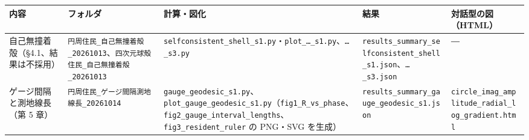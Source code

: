 \documentclass[
  a4paper,
]{ltjsarticle}
\newcounter{none} %
\begin{document}
{\def\LTcaptype{none} %
\begin{longtable}[]{@{}
  >{\raggedright\arraybackslash}p{}
  >{\raggedright\arraybackslash}p{}
  >{\raggedright\arraybackslash}p{}
  >{\raggedright\arraybackslash}p{}
  >{\raggedright\arraybackslash}p{}@{}}
\toprule\noalign{}
\begin{minipage}[b]{\linewidth}\raggedright
内容
\end{minipage} & \begin{minipage}[b]{\linewidth}\raggedright
フォルダ
\end{minipage} & \begin{minipage}[b]{\linewidth}\raggedright
計算・図化
\end{minipage} & \begin{minipage}[b]{\linewidth}\raggedright
結果
\end{minipage} & \begin{minipage}[b]{\linewidth}\raggedright
対話型の図（HTML）
\end{minipage} \\
\midrule\noalign{}
\endhead
\bottomrule\noalign{}
\endlastfoot
自己無撞着殻（§4.1、結果は不採用） &
\texttt{円周住民\_\allowbreak{}自己無撞着殻\_\allowbreak{}20261013}、\texttt{四次元球殻住民\_\allowbreak{}自己無撞着殻\_\allowbreak{}20261013}
&
\texttt{selfconsistent\_\allowbreak{}shell\_\allowbreak{}s1.py}・\texttt{plot\_\allowbreak{}…\_\allowbreak{}s1.py}、\texttt{…\_\allowbreak{}s3.py}
&
\texttt{results\_\allowbreak{}summary\_\allowbreak{}selfconsistent\_\allowbreak{}shell\_\allowbreak{}s1.json}、\texttt{…\_\allowbreak{}s3.json}
& ― \\
ゲージ間隔と測地線長（第 5 章） &
\texttt{円周住民\_\allowbreak{}ゲージ間隔測地線長\_\allowbreak{}20261014} &
\texttt{gauge\_\allowbreak{}geodesic\_\allowbreak{}s1.py}、\texttt{plot\_\allowbreak{}gauge\_\allowbreak{}geodesic\_\allowbreak{}s1.py}（\texttt{fig1\_\allowbreak{}R\_\allowbreak{}vs\_\allowbreak{}phase}、\texttt{fig2\_\allowbreak{}gauge\_\allowbreak{}interval\_\allowbreak{}lengths}、\texttt{fig3\_\allowbreak{}resident\_\allowbreak{}ruler}
の PNG・SVG を生成） &
\texttt{results\_\allowbreak{}summary\_\allowbreak{}gauge\_\allowbreak{}geodesic\_\allowbreak{}s1.json} &
\texttt{circle\_\allowbreak{}imag\_\allowbreak{}amplitude\_\allowbreak{}radial\_\allowbreak{}log\_\allowbreak{}gradient.html} \\

\end{longtable}}
\end{document}
